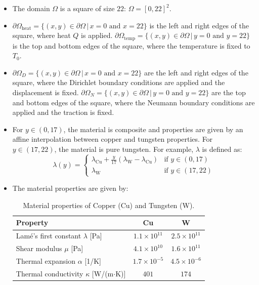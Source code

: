\documentclass[a4paper,12pt,twoside]{report}
\begin{document}
\begin{itemize}
	\item The domain $\Omega$ is a square of size $22$: $\Omega = [0,22]^2$.
	\item $\partial \Omega_{\text{heat}} = \{(x,y) \in \partial \Omega \,|\, x = 0 \text{ and } x = 22 \}$ is the left and right edges of the square, where heat $Q$ is applied. $\partial \Omega_{\text{temp}} = \{(x,y) \in \partial \Omega \,|\, y = 0 \text{ and } y = 22\}$ is the top and bottom edges of the square, where the temperature is fixed to $T_0$.
	\item $\partial \Omega_{D} = \{(x,y) \in \partial \Omega \,|\, x = 0 \text{ and } x = 22 \}$ are the left and right edges of the square, where the Dirichlet boundary conditions are applied and the displacement is fixed. $\partial \Omega_{N} = \{(x,y) \in \partial \Omega \,|\, y = 0 \text{ and } y = 22\}$ are the top and bottom edges of the square, where the Neumann boundary conditions are applied and the traction is fixed.
	\item For $y \in (0, 17)$, the material is composite and properties are given by an affine interpolation between copper and tungsten properties.
	For $y \in (17, 22)$, the material is pure tungsten. 
	For example, $\lambda$ is defined as:
	\[\lambda(y) = \begin{cases}
		\lambda_{\text{Cu}} + \frac{y}{17}(\lambda_{\text{W}} - \lambda_{\text{Cu}}) & \text{if } y \in (0, 17) \\
		\lambda_{\text{W}} & \text{if } y \in (17, 22)
	\end{cases}\]
	\item The material properties are given by: 
	\begin{table}[h!]
	\centering
	\begin{tabular}{lcc}
	\hline
	\textbf{Property} & \textbf{Cu} & \textbf{W} \\
	\hline
	Lamé's first constant $\lambda$ [Pa] & $1.1\times 10^{11}$ & $2.5\times 10^{11}$ \\
	Shear modulus $\mu$ [Pa]             & $4.1\times 10^{10}$ & $1.6\times 10^{11}$ \\
	Thermal expansion $\alpha$ [1/K]     & $1.7\times 10^{-5}$ & $4.5\times 10^{-6}$ \\
	Thermal conductivity $\kappa$ [W/(m$\cdot$K)] & $401$ & $174$ \\
	\hline
	\end{tabular}
	\caption{Material properties of Copper (Cu) and Tungsten (W).}
	\end{table}
\end{itemize}
\end{document}
